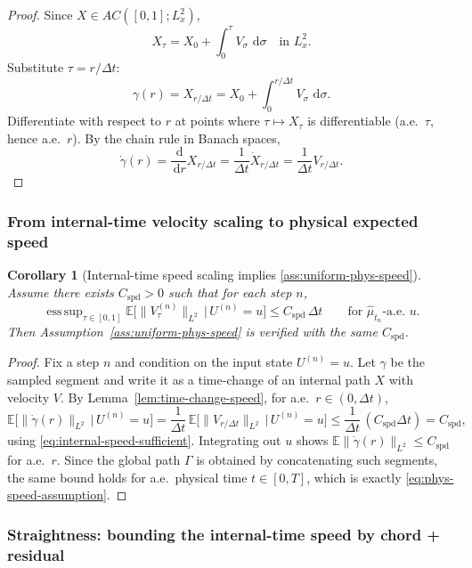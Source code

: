 \documentclass{article}
\numberwithin{equation}{section}
\theoremstyle{plain}
\newtheorem{corollary}[theorem]{Corollary}
\theoremstyle{definition}
\theoremstyle{remark}
\newcommand{\E}{\mathbb{E}}
\newcommand{\dd}{\,\mathrm{d}}
\DeclareMathOperator*{\esssup}{ess\,sup}
\begin{document}
\begin{proof}
Since $X\in AC([0,1];L^2_x)$,
\[
X_\tau = X_0 + \int_0^\tau V_\sigma\,\dd\sigma \quad\text{in }L^2_x.
\]
Substitute $\tau=r/\Delta t$:
\[
\gamma(r)=X_{r/\Delta t} = X_0 + \int_0^{r/\Delta t} V_\sigma\,\dd\sigma.
\]
Differentiate with respect to $r$ at points where $\tau\mapsto X_\tau$ is differentiable (a.e.\ $\tau$, hence a.e.\ $r$).
By the chain rule in Banach spaces,
\[
\dot\gamma(r)=\frac{\dd}{\dd r}X_{r/\Delta t}=\frac{1}{\Delta t}\dot X_{r/\Delta t}=\frac{1}{\Delta t}V_{r/\Delta t}.
\]
\end{proof}

\subsubsection{From internal-time velocity scaling to physical expected speed}

\begin{corollary}[Internal-time speed scaling implies \cref{ass:uniform-phys-speed}]
\label{cor:internal-speed-sufficient}
Assume there exists $C_{\mathrm{spd}}>0$ such that for each step $n$,
\begin{equation}\label{eq:internal-speed-sufficient}
\esssup_{\tau\in[0,1]}\E\big[\|V^{(n)}_\tau\|_{L^2}\,\big|\,U^{(n)}=u\big]\le C_{\mathrm{spd}}\,\Delta t
\qquad\text{for $\widehat\mu_{t_n}$-a.e.\ }u.
\end{equation}
Then Assumption~\ref{ass:uniform-phys-speed} is verified with the same $C_{\mathrm{spd}}$.
\end{corollary}

\begin{proof}
Fix a step $n$ and condition on the input state $U^{(n)}=u$.
Let $\gamma$ be the sampled segment and write it as a time-change of an internal path $X$ with velocity $V$.
By Lemma~\ref{lem:time-change-speed}, for a.e.\ $r\in(0,\Delta t)$,
\[
\E\big[\|\dot\gamma(r)\|_{L^2}\,\big|\,U^{(n)}=u\big]
=
\frac{1}{\Delta t}\,\E\big[\|V_{r/\Delta t}\|_{L^2}\,\big|\,U^{(n)}=u\big]
\le
\frac{1}{\Delta t}\,(C_{\mathrm{spd}}\Delta t)
=
C_{\mathrm{spd}},
\]
using \eqref{eq:internal-speed-sufficient}. Integrating out $u$ shows $\E\|\dot\gamma(r)\|_{L^2}\le C_{\mathrm{spd}}$ for a.e.\ $r$.
Since the global path $\Gamma$ is obtained by concatenating such segments, the same bound holds for a.e.\ physical time $t\in[0,T]$,
which is exactly \eqref{eq:phys-speed-assumption}.
\end{proof}

\subsubsection{Straightness: bounding the internal-time speed by chord + residual}
\end{document}
